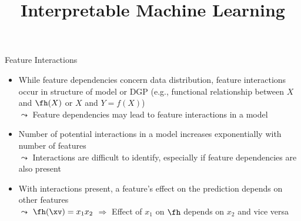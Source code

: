 \documentclass[11pt,compress,t,notes=noshow, aspectratio=169, xcolor=table]{beamer}
\title{Interpretable Machine Learning}
\date{}
\begin{document}
\newcommand{\titlefigure}{figure/open_blackbox}
\newcommand{\learninggoals}{
\item Feature interactions}



\begin{frame}{Feature Interactions}
\begin{itemize}
\item While feature dependencies concern data distribution, feature interactions occur in structure of model or DGP (e.g., functional relationship between $X$ and $\fh(X)$ or $X$ and $Y = f(X)$)\\
$\leadsto$ Feature dependencies may lead to feature interactions in a model
\pause
\item Number of potential interactions in a model increases exponentially with number of features \\
$\leadsto$ Interactions are difficult to identify, especially if feature dependencies are also present
\pause
\item With interactions present, a feature's effect on the prediction depends on other features\\
$\leadsto$
$\fh(\xv) = x_1 x_2$ $\Rightarrow$ Effect of $x_1$ on $\fh$ depends on $x_2$ and vice versa

\begin{columns}[T, totalwidth=\textwidth]
\begin{column}{0.5\textwidth}
\centering
{}
\end{column}
\end{columns}
\end{itemize}
\end{frame}
\end{document}
